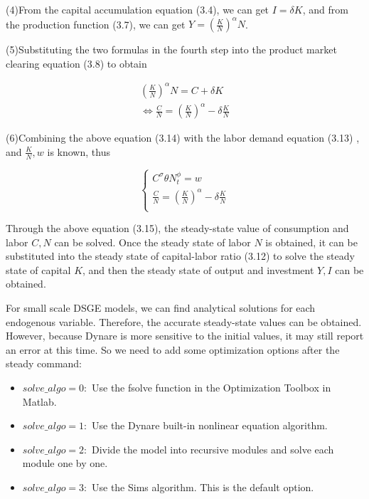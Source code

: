 \documentclass[10pt,math=newtx,citestyle=gb7714-2015,bibstyle=gb7714-2015]{elegantbook}
\begin{document}
	(4)From the capital accumulation equation (3.4), we can get $I=\delta K$, and from the production function (3.7), we can get $Y=(\frac{K}{N})^{\alpha}N$.
	
	(5)Substituting the two formulas in the fourth step into the product market clearing equation (3.8) to obtain
	
	\begin{equation}\label{label}
		\begin{split}
			(\frac{K}{N})^{\alpha}N=C+\delta K\\
			\Leftrightarrow \frac{C}{N}=(\frac{K}{N})^{\alpha}-\delta \frac{K}{N}
		\end{split}
	\end{equation}
	
	(6)Combining the above equation (3.14) with the labor demand equation (3.13) , and $\frac{K}{N},w$ is known, thus
	
	\begin{equation}\label{label}
		\left\{
		\begin{aligned}
			C^{\sigma}\theta N_t^{\phi}=w\\
			\frac{C}{N}=(\frac{K}{N})^{\alpha}-\delta \frac{K}{N}\\
		\end{aligned}
		\right.
	\end{equation}
	
	Through the above equation (3.15), the steady-state value of consumption and labor $C,N$ can be solved. Once the steady state of labor $N$ is obtained, it can be substituted into the steady state of capital-labor ratio (3.12) to solve the steady state of capital $K$, and then the steady state of output and investment $Y,I$ can be obtained.
	
	For small scale DSGE models, we can find analytical solutions for each endogenous variable. Therefore, the accurate steady-state values can be obtained. However, because Dynare is more sensitive to the initial values, it may still report an error at this time. So we need to add some optimization options after the steady command:
	
	\begin{itemize}
		\item $solve\_algo=0:$ Use the fsolve function in the Optimization Toolbox in Matlab.
		\item $solve\_algo=1:$ Use the Dynare built-in nonlinear equation algorithm.
		\item $solve\_algo=2:$ Divide the model into recursive modules and solve each module one by one.
		\item $solve\_algo=3:$ Use the Sims algorithm. This is the default option.
	\end{itemize}
	
\end{document}
